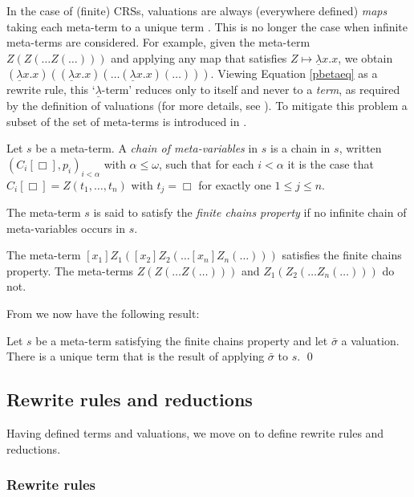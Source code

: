 \documentclass{LMCS}
\theoremstyle{definition}
\newcommand{\ulam}{\underline{\lambda}}
\begin{document}
In the case of (finite) CRSs, valuations are always (everywhere defined) \emph{maps} taking each meta-term to a unique term \cite[Remark II.1.10.1]{K80}. This is no longer the case when infinite meta-terms are considered. For example, given the meta-term $Z(Z(\ldots Z(\ldots)))$ and applying any map that satisfies $Z \mapsto \ulam x.x$, we obtain $(\ulam x. x)((\ulam x. x)(\ldots (\ulam x. x)(\ldots)))$. Viewing Equation \eqref{pbetaeq} as a rewrite rule, this `$\ulam$-term' reduces only to itself and never to a \emph{term}, as required by the definition of valuations (for more details, see \cite{JJ05a}). To mitigate this problem a subset of the set of meta-terms is introduced in \cite{JJ05a}.
\begin{defi}
Let $s$ be a meta-term.  A \emph{chain of meta-variables} in $s$ is a chain in $s$, written $(C_i[\Box],p_i)_{i < \alpha}$ with $\alpha \leq \omega$, such that for each $i < \alpha$ it is the case that $C_i[\Box] = Z(t_1, \ldots, t_n)$ with $t_j = \Box$ for exactly one $1 \leq j \leq n$.

The meta-term $s$ is said to satisfy the \emph{finite chains property} if no infinite chain of meta-variables occurs in $s$.
\end{defi}

\begin{exa}
The meta-term $[x_1]Z_1([x_2]Z_2(\ldots [x_n]Z_n(\ldots)))$ satisfies the finite chains property. The meta-terms $Z(Z(\ldots Z(\ldots)))$ and $Z_1(Z_2(\ldots Z_n(\ldots)))$ do not.
\end{exa}

From \cite{JJ05a} we now have the following result:
\begin{prop}
\label{prop:metasane}
Let $s$ be a meta-term satisfying the finite chains property and
let $\bar{\sigma}$ a valuation. There is a unique term that is the
result of applying $\bar{\sigma}$ to $s$. \qed
\end{prop}

\subsection{Rewrite rules and reductions}
\label{sec:rules}

Having defined terms and valuations, we move on to define rewrite rules and reductions.

\subsubsection{Rewrite rules}
\end{document}
